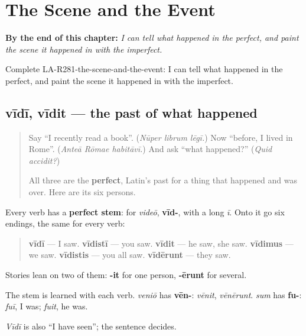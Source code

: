 
\chapter{The Scene and the Event}
\label{ch:la-the-scene-and-the-event}

\begin{chapteropening}
\textbf{By the end of this chapter:} \emph{I can tell what happened in the perfect, and paint the scene it happened in with the imperfect.}

Complete LA-R281-the-scene-and-the-event: I can tell what happened in the perfect, and paint the scene it happened in with the imperfect.
\end{chapteropening}

\section[vīdī, vīdit, vīdērunt]{vīdī, vīdit — the past of what happened}

\label{lesson:LA-C281-vidi-vidit}



\begin{quote}
Say \textquotedblleft{}I recently read a book\textquotedblright{}. (\emph{Nūper librum lēgī.}) Now \textquotedblleft{}before, I lived in Rome\textquotedblright{}. (\emph{Anteā Rōmae habitāvī.}) And ask \textquotedblleft{}what happened?\textquotedblright{} (\emph{Quid accidit?})

All three are the \textbf{perfect}, Latin's past for a thing that happened and was over. Here are its six persons.
\end{quote}

\begin{grammarlens}[title={Grammar Lens: one stem, six endings}]
Every verb has a \textbf{perfect stem}: for \emph{videō}, \textbf{vīd-}, with a long \emph{ī}. Onto it go six endings, the same for every verb:

\begin{quote}
\textbf{vīdī} — I saw. \textbf{vīdistī} — you saw. \textbf{vīdit} — he saw, she saw. \textbf{vīdimus} — we saw. \textbf{vīdistis} — you all saw. \textbf{vīdērunt} — they saw.
\end{quote}

Stories lean on two of them: \textbf{-it} for one person, \textbf{-ērunt} for several.

The stem is learned with each verb. \emph{veniō} has \textbf{vēn-}: \emph{vēnit}, \emph{vēnērunt}. \emph{sum} has \textbf{fu-}: \emph{fuī}, I was; \emph{fuit}, he was.

\emph{Vīdī} is also \textquotedblleft{}I have seen\textquotedblright{}; the sentence decides.
\end{grammarlens}

